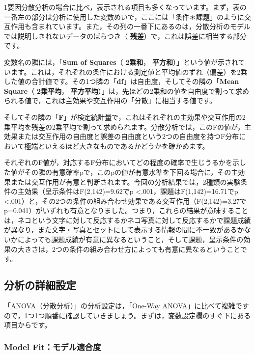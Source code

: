 \documentclass[
  12pt,
  a5jpaper,
  lualatex, ja=standard]{bxjsbook}
\renewcommand{\emph}[1]{\textbf{\color{emph} #1}}
\begin{document}
1要因分散分析の場合に比べ，表示される項目も多くなっています。まず，表の一番左の部分は分析に使用した変数めいで，ここには「条件＊課題」のように交互作用も含まれています。また，その列の一番下にあるのは，分散分析のモデルでは説明しきれないデータのばらつき（\emph{残差}）で，これは誤差に相当する部分です。

変数名の隣には，「\textbf{Sum of Squares}（\emph{2乗和}，\emph{平方和}）」という値が示されています。これは，それぞれの条件における測定値と平均値のずれ（偏差）を2乗した値の合計値です。その1つ隣の「\textbf{df}」は自由度，そしてその隣の「\textbf{Mean Square}（\emph{2乗平均}，\emph{平方平均}）」は，先ほどの2乗和の値を自由度で割って求められる値で，これは主効果や交互作用の「分散」に相当する値です。

そしてその隣の「\textbf{F}」が検定統計量で，これはそれぞれの主効果や交互作用の2乗平均を残差の2乗平均で割って求められます。分散分析では，このFの値が，主効果または交互作用の自由度と誤差の自由度という2つの自由度を持つF分布において極端といえるほど大きなものであるかどうかを確かめます。

それぞれのF値が，対応するF分布においてどの程度の確率で生じうるかを示した値がその隣の有意確率pで，このpの値が有意水準を下回る場合に，その主効果または交互作用が有意と判断されます。今回の分析結果では，2種類の実験条件の主効果（呈示条件はF(2,142)=9.62でp \textless.001，課題はF(1,142)=16.71でp \textless.001）と，その2つの条件の組み合わせ効果である交互作用（F(2,142)=3.27でp=0.041）がいずれも有意となりました。つまり，これらの結果が意味することは，ネコという文字に対して反応するかネコ写真に対して反応するかで課題成績が異なり，また文字・写真とセットにして表示する情報の間に不一致があるかないかによっても課題成績が有意に異なるということ，そして課題，呈示条件の効果の大きさは，2つの条件の組み合わせ方によっても有意に異なるということです。

\hypertarget{sub:ANOVA-anova-details}{%
\subsection{分析の詳細設定}\label{sub:ANOVA-anova-details}}

「ANOVA（分散分析）」の分析設定は，「One-Way ANOVA」に比べて複雑ですので，1つ1つ順番に確認していきましょう。まずは，変数設定欄のすぐ下にある項目からです。

\hypertarget{model-fitux30e2ux30c7ux30ebux9069ux5408ux5ea6}{%
\subsubsection*{Model Fit：モデル適合度}\label{model-fitux30e2ux30c7ux30ebux9069ux5408ux5ea6}}
\end{document}
